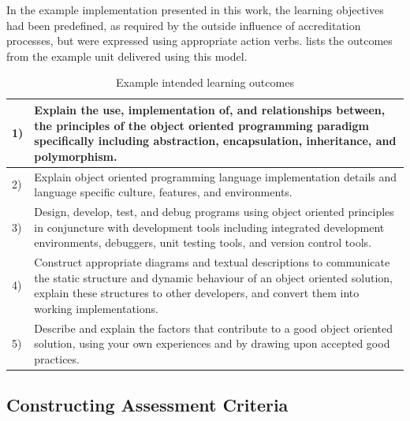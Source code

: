 In the example implementation presented in this work, the learning objectives had been predefined, as required by the outside influence of accreditation processes, but were expressed using appropriate action verbs.  lists the outcomes from the example unit delivered using this model.

\begin{table}[!t]
  \footnotesize
\renewcommand{\arraystretch}{1.3}
\caption{Example intended learning outcomes}
\label{tbl:example_intended_learning_outcomes}
\centering
\begin{tabular}{|l p{4.25in}|}
\hline
1) & Explain the use, implementation of, and relationships between, the principles of the object oriented programming paradigm specifically including abstraction, encapsulation, inheritance, and polymorphism.
\\
\hline
2) & Explain object oriented programming language implementation details and language specific culture, features, and environments.
\\
\hline
3) & Design, develop, test, and debug programs using object oriented principles in conjuncture with development tools including integrated development environments, debuggers, unit testing tools, and version control tools. \\
\hline
4) & Construct appropriate diagrams and textual descriptions to communicate the static structure and dynamic behaviour of an object oriented solution, explain these structures to other developers, and convert them into working implementations.\\
\hline
5) & Describe and explain the factors that contribute to a good object oriented solution, using your own experiences and by drawing upon accepted good practices. \\
\hline
\end{tabular}
\end{table}







\subsection{Constructing Assessment Criteria} %
\label{sub:constructing_assessment_criteria}

